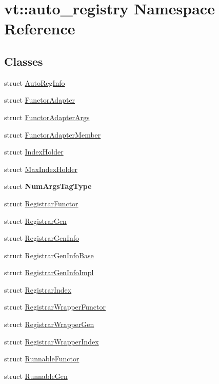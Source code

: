 \hypertarget{namespacevt_1_1auto__registry}{}\section{vt\+:\+:auto\+\_\+registry Namespace Reference}
\label{namespacevt_1_1auto__registry}
\subsection*{Classes}
\begin{DoxyCompactItemize}
\item 
struct \hyperlink{structvt_1_1auto__registry_1_1_auto_reg_info}{Auto\+Reg\+Info}
\item 
struct \hyperlink{structvt_1_1auto__registry_1_1_functor_adapter}{Functor\+Adapter}
\item 
struct \hyperlink{structvt_1_1auto__registry_1_1_functor_adapter_args}{Functor\+Adapter\+Args}
\item 
struct \hyperlink{structvt_1_1auto__registry_1_1_functor_adapter_member}{Functor\+Adapter\+Member}
\item 
struct \hyperlink{structvt_1_1auto__registry_1_1_index_holder}{Index\+Holder}
\item 
struct \hyperlink{structvt_1_1auto__registry_1_1_max_index_holder}{Max\+Index\+Holder}
\item 
struct {\bfseries Num\+Args\+Tag\+Type}
\item 
struct \hyperlink{structvt_1_1auto__registry_1_1_registrar_functor}{Registrar\+Functor}
\item 
struct \hyperlink{structvt_1_1auto__registry_1_1_registrar_gen}{Registrar\+Gen}
\item 
struct \hyperlink{structvt_1_1auto__registry_1_1_registrar_gen_info}{Registrar\+Gen\+Info}
\item 
struct \hyperlink{structvt_1_1auto__registry_1_1_registrar_gen_info_base}{Registrar\+Gen\+Info\+Base}
\item 
struct \hyperlink{structvt_1_1auto__registry_1_1_registrar_gen_info_impl}{Registrar\+Gen\+Info\+Impl}
\item 
struct \hyperlink{structvt_1_1auto__registry_1_1_registrar_index}{Registrar\+Index}
\item 
struct \hyperlink{structvt_1_1auto__registry_1_1_registrar_wrapper_functor}{Registrar\+Wrapper\+Functor}
\item 
struct \hyperlink{structvt_1_1auto__registry_1_1_registrar_wrapper_gen}{Registrar\+Wrapper\+Gen}
\item 
struct \hyperlink{structvt_1_1auto__registry_1_1_registrar_wrapper_index}{Registrar\+Wrapper\+Index}
\item 
struct \hyperlink{structvt_1_1auto__registry_1_1_runnable_functor}{Runnable\+Functor}
\item 
struct \hyperlink{structvt_1_1auto__registry_1_1_runnable_gen}{Runnable\+Gen}
\end{DoxyCompactItemize}
